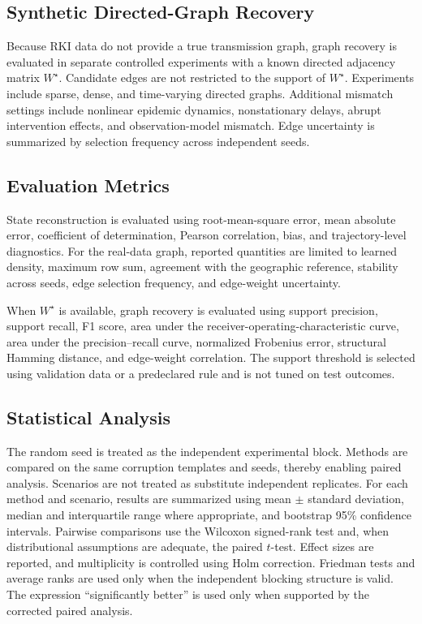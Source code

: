 \subsection{Synthetic Directed-Graph Recovery}
\label{subsec:synthetic_graph_recovery_new}
Because RKI data do not provide a true transmission graph, graph recovery is evaluated in separate controlled experiments with a known directed adjacency matrix $W^{\star}$. Candidate edges are not restricted to the support of $W^{\star}$. Experiments include sparse, dense, and time-varying directed graphs. Additional mismatch settings include nonlinear epidemic dynamics, nonstationary delays, abrupt intervention effects, and observation-model mismatch. Edge uncertainty is summarized by selection frequency across independent seeds.

\subsection{Evaluation Metrics}
\label{subsec:evaluation_metrics_new}
State reconstruction is evaluated using root-mean-square error, mean absolute error, coefficient of determination, Pearson correlation, bias, and trajectory-level diagnostics. For the real-data graph, reported quantities are limited to learned density, maximum row sum, agreement with the geographic reference, stability across seeds, edge selection frequency, and edge-weight uncertainty.

When $W^{\star}$ is available, graph recovery is evaluated using support precision, support recall, F1 score, area under the receiver-operating-characteristic curve, area under the precision--recall curve, normalized Frobenius error, structural Hamming distance, and edge-weight correlation. The support threshold is selected using validation data or a predeclared rule and is not tuned on test outcomes.

\subsection{Statistical Analysis}
\label{subsec:statistical_analysis_new}
The random seed is treated as the independent experimental block. Methods are compared on the same corruption templates and seeds, thereby enabling paired analysis. Scenarios are not treated as substitute independent replicates. For each method and scenario, results are summarized using mean $\pm$ standard deviation, median and interquartile range where appropriate, and bootstrap 95\% confidence intervals. Pairwise comparisons use the Wilcoxon signed-rank test and, when distributional assumptions are adequate, the paired $t$-test. Effect sizes are reported, and multiplicity is controlled using Holm correction. Friedman tests and average ranks are used only when the independent blocking structure is valid. The expression ``significantly better'' is used only when supported by the corrected paired analysis.

